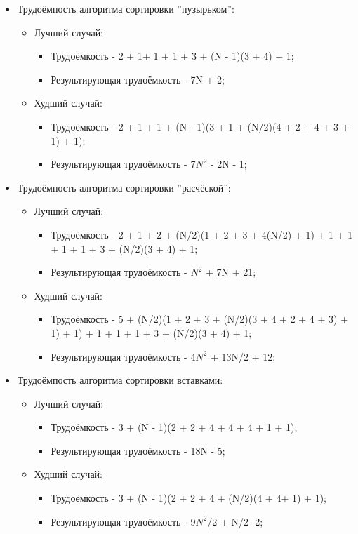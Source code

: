\begin{itemize}
	\item Трудоёмпость алгоритма сортировки ''пузырьком'':
	\begin{itemize}
		\item Лучший случай:
		\begin{itemize}
			\item Трудоёмкость - 2 + 1+ 1 + 1 + 3 + (N - 1)(3 + 4) + 1;
			\item Результирующая трудоёмкость - 7N + 2;
		\end{itemize}
		\item Худший случай:
		\begin{itemize}
			\item Трудоёмкость - 2 + 1 + 1 + (N - 1)(3 + 1 + (N/2)(4 + 2 + 4 + 3 + 1) + 1);
			\item Результирующая трудоёмкость - 7$N^2$ - 2N - 1;
		\end{itemize}
	\end{itemize}
	
	\item Трудоёмпость алгоритма сортировки ''расчёской'':
	\begin{itemize}
		\item Лучший случай:
		\begin{itemize}
			\item Трудоёмкость - 2 + 1 + 2 + (N/2)(1 + 2 + 3 + 4(N/2) + 1) + 1 + 1 + 1 + 1 + 3 + (N/2)(3 + 4) + 1;
			\item Результирующая трудоёмкость - $N^2$ + 7N + 21;
		\end{itemize}
		\item Худший случай:
		\begin{itemize}
			\item Трудоёмкость - 5 + (N/2)(1 + 2 + 3 + (N/2)(3 + 4 + 2 + 4 + 3) + 1) + 1) + 1 + 1 + 1 + 3 + (N/2)(3 + 4) + 1;
			\item Результирующая трудоёмкость - 4$N^2$ + 13N/2 + 12;
		\end{itemize}
	\end{itemize}

	\item Трудоёмпость алгоритма сортировки вставками:
	\begin{itemize}
		\item Лучший случай:
		\begin{itemize}
			\item Трудоёмкость - 3 + (N - 1)(2 + 2 + 4 + 4 + 4 + 1 + 1);
			\item Результирующая трудоёмкость - 18N - 5;
		\end{itemize}
		\item Худший случай:
		\begin{itemize}
			\item Трудоёмкость - 3 + (N - 1)(2 + 2 + 4 + (N/2)(4 + 4+ 1) + 1);
			\item Результирующая трудоёмкость - 9$N^2$/2 + N/2 -2;
		\end{itemize}
	\end{itemize}
\end{itemize}

